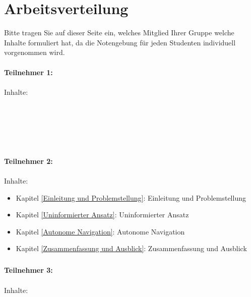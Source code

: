 \chapter*{Arbeitsverteilung}

Bitte tragen Sie auf dieser Seite ein, welches Mitglied Ihrer Gruppe welche Inhalte formuliert hat, da die Notengebung für jeden Studenten individuell vorgenommen wird.\\
\\
\textbf{Teilnehmer 1:} \\
\\
 Inhalte: \\
\\
\\
\\
\\
\\
\\
\textbf{Teilnehmer 2:} \\
\\
 Inhalte: 
\begin{itemize}
    \item Kapitel \ref{Einleitung und Problemstellung}: Einleitung und Problemstellung
    \item Kapitel \ref{Uninformierter Ansatz}: Uninformierter Ansatz
    \item Kapitel \ref{Autonome Navigation}: Autonome Navigation
    \item Kapitel \ref{Zusammenfassung und Ausblick}: Zusammenfassung und Ausblick
\end{itemize}

\paragraph*{}
\textbf{Teilnehmer 3:} \\
\\
 Inhalte: 